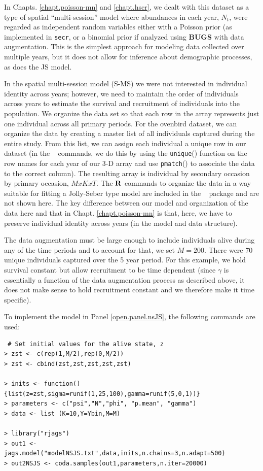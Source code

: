 In Chapts. \ref{chapt.poisson-mn} and \ref{chapt.hscr}, we dealt with this dataset as a type
of  spatial ``multi-session''
model where abundances in each year, $N_{t}$, were regarded as
independent random variables either with a Poisson prior (as
implemented in \mbox{\tt secr}, or a binomial prior if analyzed using
{\bf BUGS} with data augmentation.
This 
is the simplest approach for modeling data
collected over multiple years, but it does not allow for inference
about demographic processes, as does the JS model.

In the spatial multi-session
model (S-MS) we were not
interested in individual identity across years; however, we need to maintain the order of individuals across years
to estimate the survival and recruitment of individuals into the population.
We organize the data set so that each row in the
array represents just one individual across all primary periods.
For the ovenbird dataset, we
can organize the data by creating a master list of all individuals
captured during the entire study.  From this list, we can assign each
individual a unique row in our dataset (in the \R~ commands,
we do this by using the \mbox{\tt unique}() function
on the row names
for each year of our 3-D array and use \mbox{\tt pmatch}()
to associate the data to the correct column).  The resulting array is individual by 
secondary occasion by primary occasion, $M x K x T$.
The ${\bf R}$ commands
to organize the data in a way suitable for fitting a Jolly-Seber type
model 
are included in the \scrbook~ package and are not
shown here.
The key difference between our model and organization of the data here and that 
in
Chapt. \ref{chapt.poisson-mn} is that, here, we have to preserve
individual identity across years (in the model and data structure). 

The data
augmentation must be large enough to include individuals alive during
any of the time periods and to account for that, we set $M=200$.  There 
were 70 unique individuals captured over the 5 year period.
For this example,
we hold survival constant but allow recruitment to be time dependent
(since $\gamma$ is essentially a function of the data augmentation
process as described above, it does not make sense to hold recruitment constant and we
therefore make it time specific).

To implement the model in Panel \ref{open.panel.nsJS}, the following commands
are used:

{\small
\begin{verbatim}
 # Set initial values for the alive state, z
> zst <- c(rep(1,M/2),rep(0,M/2))
> zst <- cbind(zst,zst,zst,zst,zst)

> inits <- function(){list(z=zst,sigma=runif(1,25,100),gamma=runif(5,0,1))}
> parameters <- c("psi","N","phi", "p.mean", "gamma")
> data <- list (K=10,Y=Ybin,M=M)

> library("rjags")
> out1 <- jags.model("modelNSJS.txt",data,inits,n.chains=3,n.adapt=500)
> out2NSJS <- coda.samples(out1,parameters,n.iter=20000)
\end{verbatim}
}

